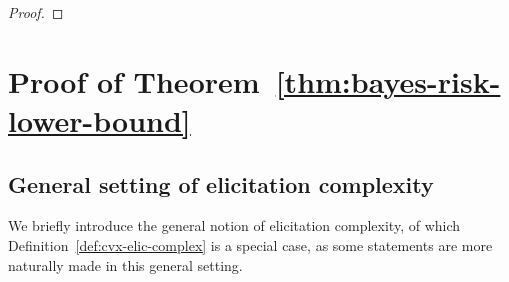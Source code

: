 \documentclass[anon,12pt]{colt2021} %
\newcommand{\reals}{\mathbb{R}}
\newcommand{\simplex}{\Delta_\Y}
\newcommand{\prop}[2][\mathcal{P}]{\mathrm{prop}_{#1}[#2]}
\newcommand{\R}{\mathcal{R}}
\newcommand{\Sc}{\mathcal{S}}  %
\newcommand{\Y}{\mathcal{Y}}
\begin{document}
\begin{proof}
\end{proof}

\section{Proof of Theorem~\ref{thm:bayes-risk-lower-bound}}

\newcommand{\EL}{\mathcal{E}}
\newcommand{\defeq}{:=}
\newcommand{\conv}{\mathrm{conv}}

\subsection{General setting of elicitation complexity}

We briefly introduce the general notion of elicitation complexity, of which Definition~\ref{def:cvx-elic-complex} is a special case, as some statements are more naturally made in this general setting.
\end{document}
